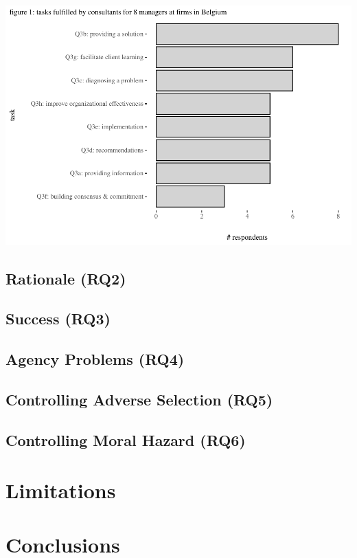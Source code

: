 \documentclass[12pt]{article}
\begin{document}
\(~\)

\includegraphics{2_ams_five_pager_files/figure-latex/unnamed-chunk-2-1.pdf}

\subsection{Rationale (RQ2)}\label{rationale-rq2}

\subsection{Success (RQ3)}\label{success-rq3}

\subsection{Agency Problems (RQ4)}\label{agency-problems-rq4}

\subsection{Controlling Adverse Selection
(RQ5)}\label{controlling-adverse-selection-rq5}

\subsection{Controlling Moral Hazard
(RQ6)}\label{controlling-moral-hazard-rq6}

\section{Limitations}\label{limitations}

\section{Conclusions}\label{conclusions}


\renewcommand\refname{References}

\end{document}
